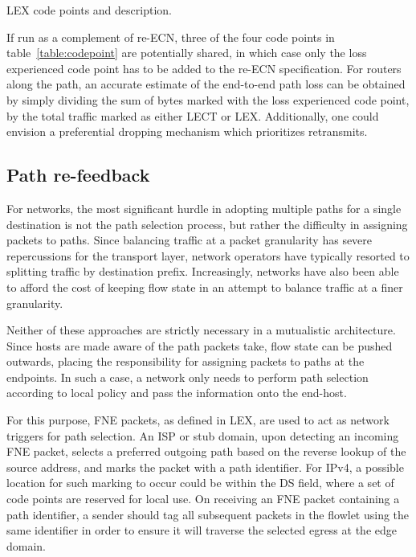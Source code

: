 \begin{table}
\footnotesize
\centering
{}
    
\caption{\acs{LEX} code points and description.}
\label{table:codepoint}
\end{table}

If run as a complement of re-\ac{ECN}, three of the four code points in table~\ref{table:codepoint} are potentially shared, in which case only the loss experienced code point has to be added to the re-\ac{ECN} specification. For routers along the path, an accurate estimate of the end-to-end path loss can be obtained by simply dividing the sum of bytes marked with the loss experienced code point, by the total traffic marked as either \ac{LECT} or \ac{LEX}. Additionally, one could envision a preferential dropping mechanism which prioritizes retransmits.

\subsection{Path re-feedback}

For networks, the most significant hurdle in adopting multiple paths for a single destination is not the path selection process, but rather the difficulty in assigning packets to paths. Since balancing traffic at a packet granularity has severe repercussions for the transport layer, network operators have typically resorted to splitting traffic by destination prefix. Increasingly, networks have also been able to afford the cost of keeping flow state in an attempt to balance traffic at a finer granularity. 

Neither of these approaches are strictly necessary in a mutualistic architecture. Since hosts are made aware of the path packets take, flow state can be pushed outwards, placing the responsibility for assigning packets to paths at the endpoints. In such a case, a network only needs to perform path selection according to local policy and pass the information onto the end-host.

For this purpose, \ac{FNE} packets, as defined in \ac{LEX}, are used to act as network triggers for path selection. 
An \ac{ISP} or stub domain, upon detecting an incoming \ac{FNE} packet, selects a preferred outgoing path based on the reverse lookup of the source address, and marks the packet with a path identifier. 
For \ac{IPv4}, a possible location for such marking to occur could be within the \ac{DS} field, where a set of code points are reserved for local use. 
On receiving an \ac{FNE} packet containing a path identifier, a sender should tag all subsequent packets in the flowlet using the same identifier in order to ensure it will traverse the selected egress at the edge domain.

